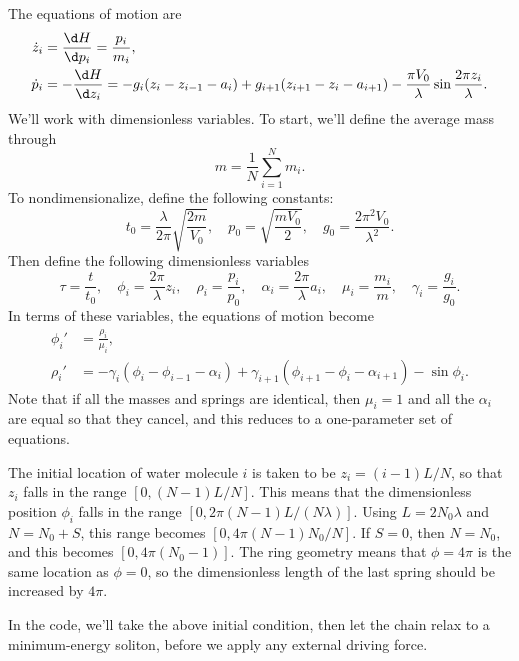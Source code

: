 \documentclass[11pt]{article}
\begin{document}
The equations of motion are
\begin{align*}
\dot{z}_i&=\frac{\d H}{\d p_i}=\frac{p_i}{m_i},\\
\dot{p}_i&=-\frac{\d H}{\d z_i}=-g_i(z_i-z_{i-1}-a_i)
	+g_{i+1}(z_{i+1}-z_i-a_{i+1})
	-\frac{\pi V_0}{\lambda}\sin\frac{2\pi z_i}{\lambda}.
\end{align*}
We'll work with dimensionless variables. To start, we'll define the average mass through
\[
m=\frac{1}{N}\sum_{i=1}^N m_i.
\]
To nondimensionalize, define the following constants:
\[
t_0 = \frac{\lambda}{2\pi}\sqrt{\frac{2m}{V_0}},\quad
p_0 = \sqrt{\frac{mV_0}{2}},\quad
g_0 = \frac{2\pi^2V_0}{\lambda^2}.
\]
Then define the following dimensionless variables
\[
\tau=\frac{t}{t_0},\quad
\phi_i=\frac{2\pi}{\lambda} z_i,\quad
\rho_i=\frac{p_i}{p_0},\quad
\alpha_i=\frac{2\pi}{\lambda} a_i,\quad
\mu_i=\frac{m_i}{m},\quad
\gamma_i=\frac{g_i}{g_0}.
\]
In terms of these variables, the equations of motion become
\begin{align*}
\phi_i'&=\frac{\rho_i}{\mu_i},\\
\rho_i'&=-\gamma_i(\phi_i-\phi_{i-1}-\alpha_i)
	+\gamma_{i+1}(\phi_{i+1}-\phi_i-\alpha_{i+1})
	-\sin\phi_i.
\end{align*}
Note that if all the masses and springs are identical, then $\mu_i=1$ and all the $\alpha_i$ are equal so that they cancel, and this reduces to a one-parameter set of equations.

The initial location of water molecule $i$ is taken to be $z_i=(i-1)L/N$, so that $z_i$ falls in the range $[0,(N-1)L/N]$. This means that the dimensionless position $\phi_i$ falls in the range $[0,2\pi(N-1)L/(N\lambda)]$. Using $L=2N_0\lambda$ and $N=N_0+S$, this range becomes $[0,4\pi(N-1)N_0/N]$. If $S=0$, then $N=N_0$, and this becomes $[0,4\pi(N_0-1)]$. The ring geometry means that $\phi=4\pi$ is the same location as $\phi=0$, so the dimensionless length of the last spring should be increased by $4\pi$.

In the code, we'll take the above initial condition, then let the chain relax to a minimum-energy soliton, before we apply any external driving force.
\end{document}
